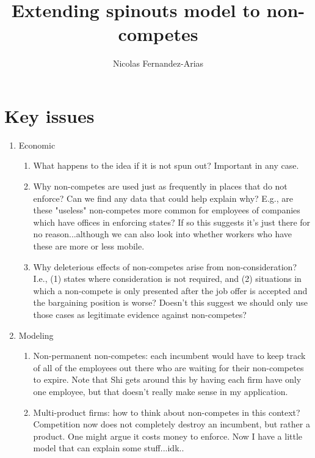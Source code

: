 \documentclass[12pt,english]{article}
\theoremstyle{remark}
\begin{document}
	
\title{Extending spinouts model to non-competes}
\author{Nicolas Fernandez-Arias}
\maketitle

\section{Key issues}

\begin{enumerate}
	\item Economic
	\begin{enumerate}
		\item What happens to the idea if it is not spun out? Important in any case.
		\item Why non-competes are used just as frequently in places that do not enforce? Can we find any data that could help explain why? E.g., are these "useless" non-competes more common for employees of companies which have offices in enforcing states? If so this suggests it's just there for no reason...although we can also look into whether workers who have these are more or less mobile. 
		\item Why deleterious effects of non-competes arise from non-consideration? I.e., (1) states where consideration is not required, and (2) situations in which a non-compete is only presented after the job offer is accepted and the bargaining position is worse? Doesn't this suggest we should only use those cases as legitimate evidence against non-competes?
	\end{enumerate}
	\item Modeling
	\begin{enumerate}
		\item Non-permanent non-competes: each incumbent would have to keep track of all of the employees out there who are waiting for their non-competes to expire. Note that Shi gets around this by having each firm have only one employee, but that doesn't really make sense in my application.
		\item Multi-product firms: how to think about non-competes in this context? Competition now does not completely destroy an incumbent, but rather a product. One might argue it costs money to enforce. Now I have a little model that can explain some stuff...idk..
	\end{enumerate}
\end{enumerate}
\end{document}
